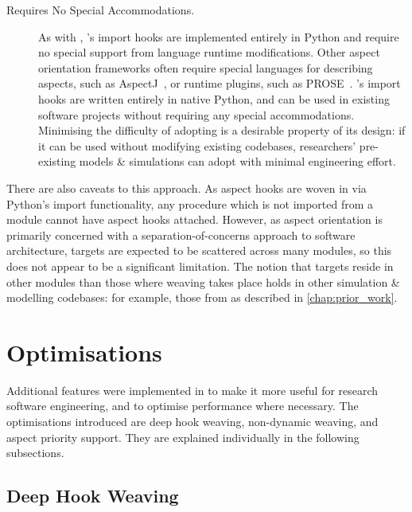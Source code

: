 \begin{description}
    \item[Requires No Special Accommodations.] As with \pydysofu{},
        \pdsfthree{}'s import hooks are implemented entirely in Python and
        require no special support from language runtime modifications. Other
        aspect orientation frameworks often require special languages for
        describing aspects, such as AspectJ~\cite{AspectJLanguageAndTools}, or
        runtime plugins, such as PROSE~\cite{popovici2002PROSE}. \pdsfthree{}'s
        import hooks are written entirely in native Python, and can be used in
        existing software projects without requiring any special accommodations.
        Minimising the difficulty of adopting \pdsfthree{} is a desirable property of
        its design: if it can be used without modifying existing codebases,
        researchers' pre-existing models \& simulations can adopt \pdsfthree{} with
        minimal engineering effort.
\end{description}

There are also caveats to this approach. As aspect hooks are woven in
\pdsfthree{} via Python's import functionality, any procedure which is not
imported from a module cannot have aspect hooks attached.  However, as aspect orientation is primarily
concerned with a separation-of-concerns approach to software architecture,
targets are expected to be scattered across many modules, so this does not
appear to be a significant limitation. The notion that targets reside in other
modules than those where weaving takes place holds in other \aspectoriented{}
simulation \& modelling codebases: for example, those from
\citet{wallis2018caise} as described in \cref{chap:prior_work}.



\section{Optimisations}
\label{pdsf3_optimisations}

Additional features were implemented in \pdsfthree to make it
more useful for research software engineering, and to optimise performance where
necessary. The optimisations introduced are deep hook weaving, non-dynamic
weaving, and aspect priority support. They are explained individually in the
following subsections.

\subsection{Deep Hook Weaving}\label{deep_hook_weaving}

